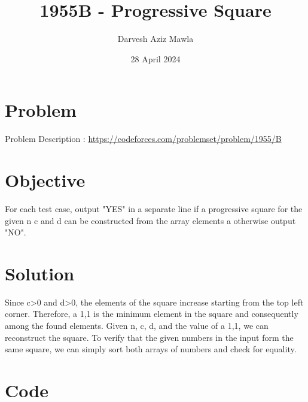 \documentclass{article}
\title{1955B - Progressive Square
}
\author{Darvesh Aziz Mawla}
\date{28 April 2024}
\begin{document}
\maketitle


\section{Problem}

Problem Description : \href{https://codeforces.com/problemset/problem/1955/C}{https://codeforces.com/problemset/problem/1955/B}

\section{Objective}

For each test case, output "YES" in a separate line if a progressive square for the given n c and d can be constructed from the array elements a otherwise output "NO".

\section{Solution}

Since c>0 and d>0, the elements of the square increase starting from the top left corner. Therefore, a 1,1 is the minimum element in the square and consequently among the found elements. Given 
n,  c,  d, and the value of a 1,1, we can reconstruct the square. To verify that the given numbers in the input form the same square, we can simply sort both arrays of numbers and check for equality.


\newpage
\section{Code}
\end{document}
